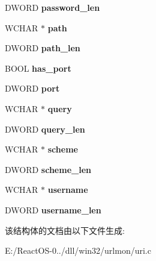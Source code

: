 \begin{DoxyCompactItemize}
\mbox{\label{struct_uri_builder_a127433fb0ac1fccdafb30c5992b3e632}} 
D\+W\+O\+RD {\bfseries password\+\_\+len}
\item 
\mbox{\label{struct_uri_builder_ab2d5219d483896a1bfcb43f119cbedb4}} 
W\+C\+H\+AR $\ast$ {\bfseries path}
\item 
\mbox{\label{struct_uri_builder_a7e312811055afea03fdcf77b61b4e419}} 
D\+W\+O\+RD {\bfseries path\+\_\+len}
\item 
\mbox{\label{struct_uri_builder_a0b9dc2e492d8ba3c58ed288ee471f733}} 
B\+O\+OL {\bfseries has\+\_\+port}
\item 
\mbox{\label{struct_uri_builder_a8fa5320b62fbbcc6fbc38144dd4bfe65}} 
D\+W\+O\+RD {\bfseries port}
\item 
\mbox{\label{struct_uri_builder_a73b2326391178045cd0ac5256dd625ee}} 
W\+C\+H\+AR $\ast$ {\bfseries query}
\item 
\mbox{\label{struct_uri_builder_a7403ac87ac06d3ddaa460bea051f4d03}} 
D\+W\+O\+RD {\bfseries query\+\_\+len}
\item 
\mbox{\label{struct_uri_builder_a1081f2202c7475869f6c1b318a2fe6a7}} 
W\+C\+H\+AR $\ast$ {\bfseries scheme}
\item 
\mbox{\label{struct_uri_builder_aaabc8d2672ad7fde15a14fdb50918d48}} 
D\+W\+O\+RD {\bfseries scheme\+\_\+len}
\item 
\mbox{\label{struct_uri_builder_a315f76bcf83ac57643483f1e69984af9}} 
W\+C\+H\+AR $\ast$ {\bfseries username}
\item 
\mbox{\label{struct_uri_builder_ac07d86f3b238b099b75949986c2858fb}} 
D\+W\+O\+RD {\bfseries username\+\_\+len}
\end{DoxyCompactItemize}


该结构体的文档由以下文件生成\+:\begin{DoxyCompactItemize}
\item 
E\+:/\+React\+O\+S-\/0../dll/win32/urlmon/uri.\+c\end{DoxyCompactItemize}
